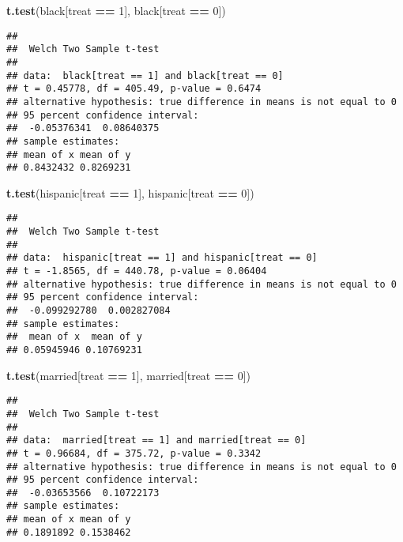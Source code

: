 \documentclass[
]{article}
\newenvironment{Shaded}{\begin{snugshade}}{\end{snugshade}}
\newcommand{\DecValTok}[1]{\textcolor[rgb]{0.00,0.00,0.81}{#1}}
\newcommand{\KeywordTok}[1]{\textcolor[rgb]{0.13,0.29,0.53}{\textbf{#1}}}
\newcommand{\NormalTok}[1]{#1}
\newcommand{\OperatorTok}[1]{\textcolor[rgb]{0.81,0.36,0.00}{\textbf{#1}}}
\newcommand{\StringTok}[1]{\textcolor[rgb]{0.31,0.60,0.02}{#1}}
\begin{document}
\begin{Shaded}
\begin{Highlighting}[]
\KeywordTok{t.test}\NormalTok{(black[treat }\OperatorTok{==}\StringTok{ }\DecValTok{1}\NormalTok{], black[treat }\OperatorTok{==}\StringTok{ }\DecValTok{0}\NormalTok{])}
\end{Highlighting}
\end{Shaded}

\begin{verbatim}
## 
##  Welch Two Sample t-test
## 
## data:  black[treat == 1] and black[treat == 0]
## t = 0.45778, df = 405.49, p-value = 0.6474
## alternative hypothesis: true difference in means is not equal to 0
## 95 percent confidence interval:
##  -0.05376341  0.08640375
## sample estimates:
## mean of x mean of y 
## 0.8432432 0.8269231
\end{verbatim}

\begin{Shaded}
\begin{Highlighting}[]
\KeywordTok{t.test}\NormalTok{(hispanic[treat }\OperatorTok{==}\StringTok{ }\DecValTok{1}\NormalTok{], hispanic[treat }\OperatorTok{==}\StringTok{ }\DecValTok{0}\NormalTok{])}
\end{Highlighting}
\end{Shaded}

\begin{verbatim}
## 
##  Welch Two Sample t-test
## 
## data:  hispanic[treat == 1] and hispanic[treat == 0]
## t = -1.8565, df = 440.78, p-value = 0.06404
## alternative hypothesis: true difference in means is not equal to 0
## 95 percent confidence interval:
##  -0.099292780  0.002827084
## sample estimates:
##  mean of x  mean of y 
## 0.05945946 0.10769231
\end{verbatim}

\begin{Shaded}
\begin{Highlighting}[]
\KeywordTok{t.test}\NormalTok{(married[treat }\OperatorTok{==}\StringTok{ }\DecValTok{1}\NormalTok{], married[treat }\OperatorTok{==}\StringTok{ }\DecValTok{0}\NormalTok{])}
\end{Highlighting}
\end{Shaded}

\begin{verbatim}
## 
##  Welch Two Sample t-test
## 
## data:  married[treat == 1] and married[treat == 0]
## t = 0.96684, df = 375.72, p-value = 0.3342
## alternative hypothesis: true difference in means is not equal to 0
## 95 percent confidence interval:
##  -0.03653566  0.10722173
## sample estimates:
## mean of x mean of y 
## 0.1891892 0.1538462
\end{verbatim}
\end{document}
